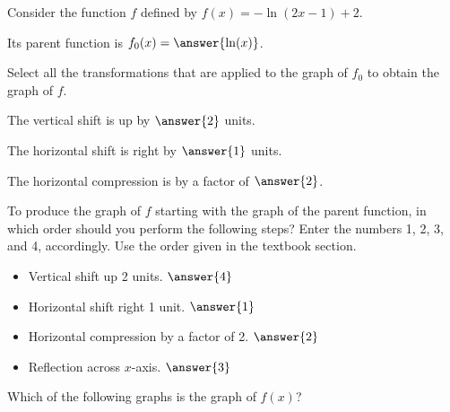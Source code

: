 \documentclass{ximera}
\author{Kenneth Berglund}
\begin{document}
\begin{exercise}
Consider the function $f$ defined by $f(x) = -\ln(2x - 1) + 2$.

Its parent function is $f_0(x) = \answer{\ln(x)}$. 

\begin{exercise}
Select all the transformations that are applied to the graph of $f_0$ to obtain the graph of $f$.
\begin{selectAll}
\end{selectAll}

\begin{exercise}
The vertical shift is up by $\answer{2}$ units.

The horizontal shift is right by $\answer{1}$ units.


The horizontal compression is by a factor of $\answer{2}$.

\begin{exercise}
To produce the graph of $f$ starting with the graph of the parent function, in which order should you perform the following steps? Enter the numbers 1, 2, 3, and 4, accordingly. Use the order given in the textbook section.
\begin{itemize}
\item Vertical shift up 2 units. $\answer{4}$
\item Horizontal shift right 1 unit. $\answer{1}$
\item Horizontal compression by a factor of 2. $\answer{2}$
\item Reflection across $x$-axis. $\answer{3}$
\end{itemize}
Which of the following graphs is the graph of $f(x)$?


\end{exercise}
\end{exercise}
\end{exercise}
\end{exercise}
\end{document}
